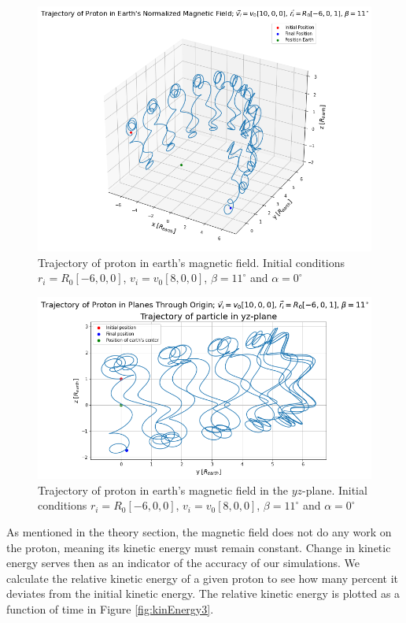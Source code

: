 \begin{figure}[H]
    \centering
    \includegraphics[scale=.4]{Images/squigglyTrajectory.png}
    \caption{Trajectory of proton in earth's magnetic field. Initial conditions $r_i=R_0[-6,0,0]$, $v_i=v_0[8,0,0]$, $\beta=11^{\circ}$ and $\alpha=0^{\circ}$}
    \label{fig:3dSquiggle}
\end{figure}

\begin{figure}[H]
    \centering
    \includegraphics[scale=.4]{Images/squigglyPlane.png}
    \caption{Trajectory of proton in earth's magnetic field in the $yz$-plane. Initial conditions $r_i=R_0[-6,0,0]$, $v_i=v_0[8,0,0]$, $\beta=11^{\circ}$ and $\alpha=0^{\circ}$}
    \label{fig:squigglyPlane}
\end{figure}

\noindent As mentioned in the theory section, the magnetic field does not do any work on the proton, meaning its kinetic energy must remain constant. Change in kinetic energy serves then as an indicator of the accuracy of our simulations. We calculate the relative kinetic energy of a given proton to see how many percent it deviates from the initial kinetic energy. The relative kinetic energy is plotted as a function of time in Figure \ref{fig:kinEnergy3}.

